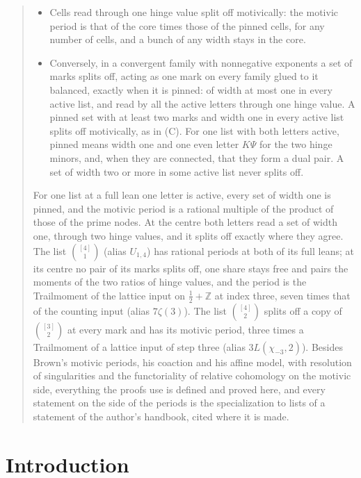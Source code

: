 \documentclass[11pt]{article}
\theoremstyle{plain}
\theoremstyle{definition}
\theoremstyle{remark}
\newcommand{\Z}{\mathbb Z}
\begin{document}
\begin{abstract}
\begin{itemize}
\item[(C)] Cells read through one hinge value split off motivically: the motivic period is that of the core times those of the pinned cells, for any number of cells, and a bunch of any width stays in the core.
\item[(D)] Conversely, in a convergent family with nonnegative exponents a set of marks splits off, acting as one mark on every family glued to it balanced, exactly when it is pinned: of width at most one in every active list, and read by all the active letters through one hinge value. A pinned set with at least two marks and width one in every active list splits off motivically, as in (C). For one list with both letters active, pinned means width one and one even letter $K\Psi$ for the two hinge minors, and, when they are connected, that they form a dual pair. A set of width two or more in some active list never splits off.
\end{itemize}
For one list at a full lean one letter is active, every set of width one is pinned, and the motivic period is a rational multiple of the product of those of the prime nodes. At the centre both letters read a set of width one, through two hinge values, and it splits off exactly where they agree. The list $\binom{[4]}1$ (alias $U_{1,4}$) has rational periods at both of its full leans; at its centre no pair of its marks splits off, one share stays free and pairs the moments of the two ratios of hinge values, and the period is the Trailmoment of the lattice input on $\frac12+\Z$ at index three, seven times that of the counting input (alias $7\zeta(3)$). The list $\binom{[4]}2$ splits off a copy of $\binom{[3]}2$ at every mark and has its motivic period, three times a Trailmoment of a lattice input of step three (alias $3L(\chi_{-3},2)$). Besides Brown's motivic periods, his coaction and his affine model, with resolution of singularities and the functoriality of relative cohomology on the motivic side, everything the proofs use is defined and proved here, and every statement on the side of the periods is the specialization to lists of a statement of the author's handbook, cited where it is made.
\end{abstract}

\tableofcontents

\section{Introduction}
\end{document}
